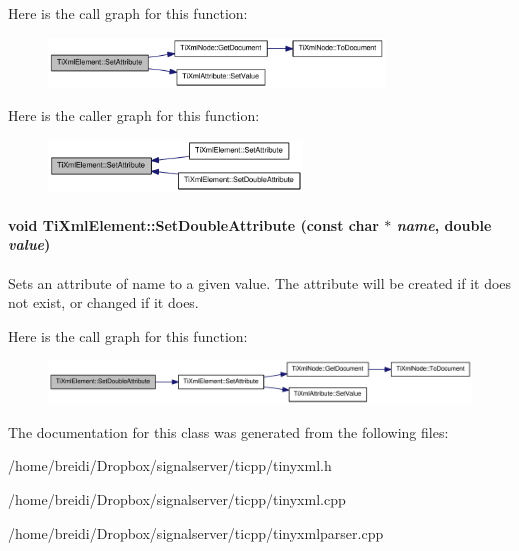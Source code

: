 Here is the call graph for this function:\nopagebreak
\begin{figure}[H]
\begin{center}
\leavevmode
\includegraphics[width=253pt]{class_ti_xml_element_abf0b3bd7f0e4c746a89ec6e7f101fc32_cgraph}
\end{center}
\end{figure}


Here is the caller graph for this function:\nopagebreak
\begin{figure}[H]
\begin{center}
\leavevmode
\includegraphics[width=191pt]{class_ti_xml_element_abf0b3bd7f0e4c746a89ec6e7f101fc32_icgraph}
\end{center}
\end{figure}
\hypertarget{class_ti_xml_element_a0d1dd975d75496778177e35abfe0ec0b}{
\paragraph[{SetDoubleAttribute}]{\setlength{\rightskip}{0pt plus 5cm}void TiXmlElement::SetDoubleAttribute (const char $\ast$ {\em name}, \/  double {\em value})}\hfill}
\label{class_ti_xml_element_a0d1dd975d75496778177e35abfe0ec0b}
Sets an attribute of name to a given value. The attribute will be created if it does not exist, or changed if it does. 

Here is the call graph for this function:\nopagebreak
\begin{figure}[H]
\begin{center}
\leavevmode
\includegraphics[width=354pt]{class_ti_xml_element_a0d1dd975d75496778177e35abfe0ec0b_cgraph}
\end{center}
\end{figure}


The documentation for this class was generated from the following files:\begin{DoxyCompactItemize}
\item 
/home/breidi/Dropbox/signalserver/ticpp/tinyxml.h\item 
/home/breidi/Dropbox/signalserver/ticpp/tinyxml.cpp\item 
/home/breidi/Dropbox/signalserver/ticpp/tinyxmlparser.cpp\end{DoxyCompactItemize}
